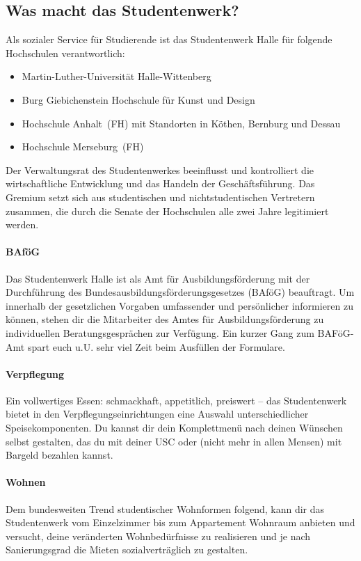 \subsection{Was macht das Studentenwerk?}

Als sozialer Service für Studierende ist das Studentenwerk Halle für folgende Hochschulen verantwortlich:

\begin{itemize}
    \item Martin-Luther-Universität Halle-Wittenberg
    \item Burg Giebichenstein Hochschule für Kunst und Design
    \item Hochschule Anhalt~(FH) mit Standorten in Köthen, Bernburg und Dessau
    \item Hochschule Merseburg~(FH)
\end{itemize}

Der Verwaltungsrat des Studentenwerkes beeinflusst und kontrolliert die wirtschaftliche Entwicklung und das Handeln der Geschäftsführung.
Das Gremium setzt sich aus studentischen und nichtstudentischen Vertretern zusammen, die durch die Senate der Hochschulen alle zwei Jahre legitimiert werden.

\paragraph{BAföG}

Das Studentenwerk Halle ist als Amt für Ausbildungsförderung mit der Durchführung des Bundesausbildungsförderungsgesetzes (BAföG) beauftragt.
Um innerhalb der gesetzlichen Vorgaben umfassender und persönlicher informieren zu können, stehen dir die Mitarbeiter des Amtes für Ausbildungsförderung zu individuellen Beratungsgesprächen zur Verfügung.
Ein kurzer Gang zum BAFöG-Amt spart euch \;u.U. sehr viel Zeit beim Ausfüllen der Formulare.

\paragraph{Verpflegung}
Ein vollwertiges Essen: schmackhaft, appetitlich, preiswert -- das Studentenwerk bietet in den Verpflegungseinrichtungen eine Auswahl unterschiedlicher Speisekomponenten.
Du kannst dir dein Komplettmenü nach deinen Wünschen selbst gestalten, das du mit deiner USC oder (nicht mehr in allen Mensen) mit Bargeld bezahlen kannst.

\paragraph{Wohnen}
Dem bundesweiten Trend studentischer Wohnformen folgend, kann dir das Studentenwerk vom Einzelzimmer bis zum Appartement Wohnraum anbieten und
versucht, deine veränderten Wohnbedürfnisse zu realisieren und je nach Sanierungsgrad die Mieten sozialverträglich zu gestalten.

